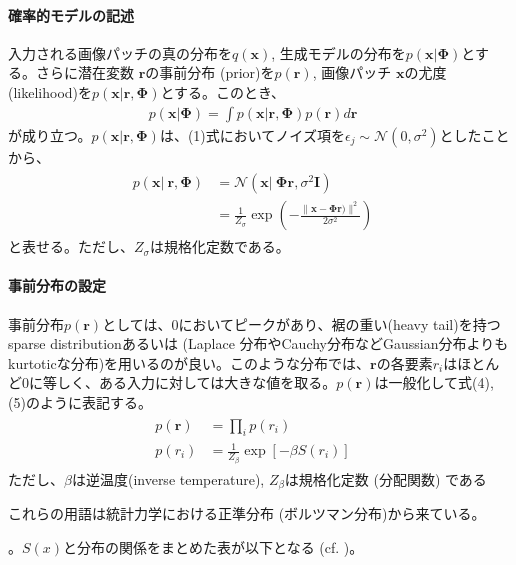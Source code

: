\documentclass[letterpaper,10pt,english]{sphinxmanual}
\begin{document}
\paragraph{確率的モデルの記述}
\label{\detokenize{11-2_sparse-coding:id1}}
入力される画像パッチの真の分布を\(q(\mathbf{x})\), 生成モデルの分布を\(p(\mathbf{x}|\mathbf{\Phi})\)とする。さらに潜在変数 \(\mathbf{r}\)の事前分布 (prior)を\(p(\mathbf{r})\), 画像パッチ \(\mathbf{x}\)の尤度 (likelihood)を\(p(\mathbf{x}|\mathbf{r}, \mathbf{\Phi})\)とする。このとき、
\begin{equation*}
\begin{split}
p(\mathbf{x}|\mathbf{\Phi})=\int p(\mathbf{x}|\mathbf{r}, \mathbf{\Phi})p(\mathbf{r})d\mathbf{r} \quad \tag{2}
\end{split}
\end{equation*}
が成り立つ。\(p(\mathbf{x}|\mathbf{r}, \mathbf{\Phi})\)は、(1)式においてノイズ項を\(\epsilon_j \sim\mathcal{N}(0, \sigma^2)\)としたことから、
\begin{equation*}
\begin{split}
\begin{align}
p(\mathbf{x}|\ \mathbf{r}, \mathbf{\Phi})&=\mathcal{N}\left(\mathbf{x}|\ \mathbf{\Phi} \mathbf{r}, \sigma^2 \mathbf{I} \right)\\
&=\frac{1}{Z_{\sigma}} \exp\left(-\frac{\|\mathbf{x} - \mathbf{\Phi} \mathbf{r})\|^2}{2\sigma^2}\right)\quad \tag{3}
\end{align}
\end{split}
\end{equation*}
と表せる。ただし、\(Z_{\sigma}\)は規格化定数である。


\paragraph{事前分布の設定}
\label{\detokenize{11-2_sparse-coding:id2}}
事前分布\(p(\mathbf{r})\)としては、0においてピークがあり、裾の重い(heavy tail)を持つsparse distributionあるいは  (Laplace 分布やCauchy分布などGaussian分布よりもkurtoticな分布)を用いるのが良い。このような分布では、\(\mathbf{r}\)の各要素\(r_i\)はほとんど0に等しく、ある入力に対しては大きな値を取る。\(p(\mathbf{r})\)は一般化して式(4), (5)のように表記する。
\begin{equation*}
\begin{split}
\begin{align}
p(\mathbf{r})&=\prod_i p(r_i) \quad \tag{4}\\
p(r_i)&=\frac{1}{Z_{\beta}}\exp \left[-\beta S(r_i)\right] \quad \tag{5}
\end{align}
\end{split}
\end{equation*}
ただし、\(\beta\)は逆温度(inverse temperature), \(Z_{\beta}\)は規格化定数 (分配関数) である%
\begin{footnote}[1]\sphinxAtStartFootnote
これらの用語は統計力学における正準分布 (ボルツマン分布)から来ている。
%
\end{footnote}。\(S(x)\)と分布の関係をまとめた表が以下となる (cf. )。
\end{document}
